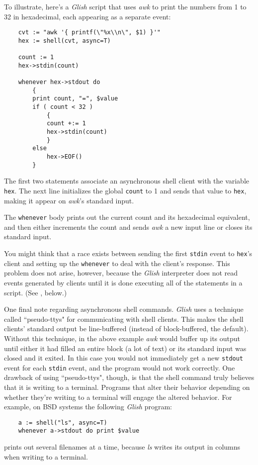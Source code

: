 To illustrate, here's a {\em Glish} script
that uses {\em awk} to print the numbers from 1 to 32 in hexadecimal,
each appearing as a separate event:
\begin{verbatim}
    cvt := "awk '{ printf(\"%x\\n\", $1) }'"
    hex := shell(cvt, async=T)

    count := 1
    hex->stdin(count)

    whenever hex->stdout do
        {
        print count, "=", $value
        if ( count < 32 )
            {
            count +:= 1
            hex->stdin(count)
            }
        else
            hex->EOF()
        }
\end{verbatim}

The first two statements associate an asynchronous shell client with the
variable {\tt hex}.  The next line initializes the global {\tt count}
to 1 and sends that value to {\tt hex}, making it appear on {\em awk\/}'s
standard input.

The {\tt whenever} body prints out the current count and its hexadecimal
equivalent, and then either increments the count and sends {\em awk} a new
input line or closes its standard input.

You might think that a race exists between sending the first {\tt stdin}
event to {\tt hex}'s client and setting up the {\tt whenever} to deal
with the client's response.  This problem does not arise, however,
because the {\em Glish} interpreter does not read events generated by
clients until it is done executing all of the statements in a script.
(See , below.)

One final note regarding asynchronous shell commands.
{\em Glish} uses a technique called ``pseudo-ttys" for communicating with
shell clients.  This makes the shell clients' standard output
be line-buffered (instead of block-buffered, the default).  Without
this technique, in the above example {\em awk} would buffer up its output
until either it had filled an entire block (a lot of text) or its standard
input was closed and it exited.  In this case you would not immediately
get a new {\tt stdout} event for each {\tt stdin} event, and the program
would not work correctly.  One drawback of using ``pseudo-ttys", though,
is that the shell command truly believes that it is writing to a terminal.
Programs that alter their behavior depending on whether they're writing
to a terminal will engage the altered behavior.  For example, on BSD
systems the following {\em Glish} program:
\begin{verbatim}
    a := shell("ls", async=T)
    whenever a->stdout do print $value
\end{verbatim}
prints out several filenames at a time, because {\em ls} writes its
output in columns when writing to a terminal.

